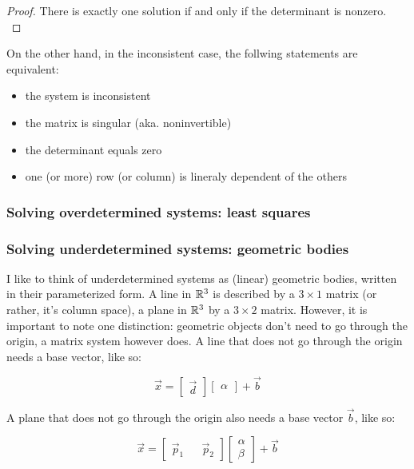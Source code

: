 \begin{proof} There is exactly one solution if and only if the determinant is nonzero. \\
\end{proof}

On the other hand, in the inconsistent case, the follwing statements are equivalent:

\begin{itemize}
    \item the system is inconsistent
    \item the matrix is singular (aka. noninvertible)
    \item the determinant equals zero
    \item one (or more) row (or column) is lineraly dependent of the others
\end{itemize}

\subsubsection{Solving overdetermined systems: least squares}


\subsubsection{Solving underdetermined systems: geometric bodies}
I like to think of underdetermined systems as (linear) geometric bodies, written in their parameterized form. A line in $\mathbb{R}^3$ is described by a $3 \times 1$ matrix (or rather, it's column space), a plane in $\mathbb{R}^3$ by a $3 \times 2$ matrix. However, it is important to note one distinction: geometric objects don't need to go through the origin, a matrix system however does. A line that does not go through the origin needs a base vector, like so: 

$$\vec{x} = \begin{bmatrix} \vec{d} \end{bmatrix} \begin{bmatrix} \alpha \end{bmatrix} + \vec{b}$$ 

A plane that does not go through the origin also needs a base vector $\vec{b}$, like so: 

$$\vec{x} = \begin{bmatrix} \vec{p}_1 && \vec{p}_2 \end{bmatrix} \begin{bmatrix} \alpha  \\ \beta \end{bmatrix} + \vec{b}  $$



